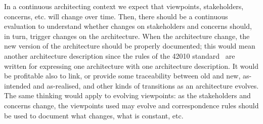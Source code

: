 In a continuous architecting context we expect that viewpoints, stakeholders, concerns, etc. will change over time. Then, there should be a continuous evaluation to understand whether changes on stakeholders and concerns should, in turn, trigger changes on the architecture.
When the architecture change, the new version of the architecture should be properly documented; this would mean another architecture description since the rules of the 42010 standard~\cite{42010} are written for expressing one architecture with one architecture description.
It would be profitable also to link, or provide some traceability between old and new, as-intended and as-realised, and other kinds of transitions as an architecture evolves. 
The same thinking would apply to evolving viewpoints: as the stakeholders and concerns change, the viewpoints used may evolve and correspondence rules should be used to document what changes, what is constant, etc.


